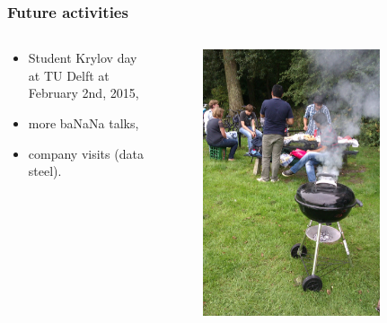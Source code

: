 \documentclass{beamer}
\begin{document}
\begin{frame}
\frametitle{Future activities}
\begin{columns}
 \begin{column}{0.8\textwidth}
 \begin{itemize}
  \item Student Krylov day at TU Delft at February 2nd, 2015,
  \item more ba{\color{red}NaN}a talks,
  \item company visits (data steel).
 \end{itemize}

 \end{column}

 \begin{column}{0.4\textwidth}
  \begin{figure}[t]
  \centering
  \includegraphics[width=0.8\textwidth]{images/bbq}
  \end{figure}
 \end{column}
 \end{columns}
\end{frame}
\end{document}
